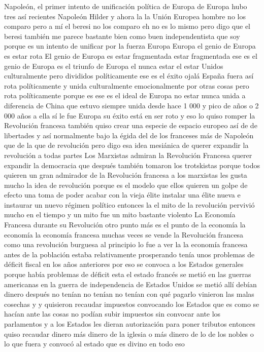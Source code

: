 Napoleón, el primer intento de unificación política de Europa
de Europa hubo tres así recientes Napoleón Hilder y ahora la la Unión Europea
hombre no los comparo pero a mí el beresi no los comparo eh no es lo mismo
pero digo que el beresi también me parece bastante bien como buen independentista que soy
porque es un intento de unificar por la fuerza Europa Europa el genio de Europa es estar rota
El genio de Europa es estar fragmentada
estar fragmentada ese es el genio de Europa es el triunfo de Europa el nunca estar el estar Unidos culturalmente
pero divididos políticamente ese es el éxito ojalá España fuera así rota políticamente y unida culturalmente
emocionalmente por otras cosas pero rota políticamente porque es ese es el ideal de Europa
no estar nunca unida a diferencia de China que estuvo siempre unida desde hace 1 000 y pico de años o 2 000 años a ella sí le fue
Europa su éxito está en ser roto y eso lo quiso romper la Revolución francesa también quiso crear una especie de espacio europeo
así de de libertades y así normalmente bajo la égida del de los franceses
más de Napoleón que de la que de revolución pero digo esa idea mesiánica de querer expandir la revolución a todas partes
Los Marxistas admiran la Revolución Francesa
querer expandir la democracia que después también tomaron los trotskistas porque todos quieren un gran admirador de la Revolución francesa a los marxistas les gusta mucho la idea de revolución
porque es el modelo que ellos quieren un golpe de efecto una toma de poder acabar con la vieja élite instalar una élite nueva
e instaurar un nuevo régimen político entonces la el mito de la revolución pervivió mucho en el tiempo y un mito fue un mito bastante violento
La Economía Francesa durante su Revolución
otro punto más es el punto de la economía la economía la economía francesa
muchas veces se vende la Revolución francesa como una revolución burguesa al principio lo fue a ver la la economía francesa antes de la población
estaba relativamente prosperando tenía unos problemas de déficit fiscal en los años anteriores por eso se convoca a los Estados generales
porque había problemas de déficit esta el estado francés se metió en las guerras americanas en la guerra de independencia de Estados Unidos
se metió allí debían dinero después no tenían no tenían no tenían con qué pagarlo vinieron las malas cosechas y
y quisieron recaudar impuestos convocando los Estados que es como se hacían ante las cosas no podían subir impuestos
sin convocar ante los parlamentos y a los Estados les dieran autorización para poner tributos
entonces quiso recaudar dinero más dinero de la iglesia o más dinero de lo de los nobles o lo que fuera y convocó al estado que es divino en todo eso
